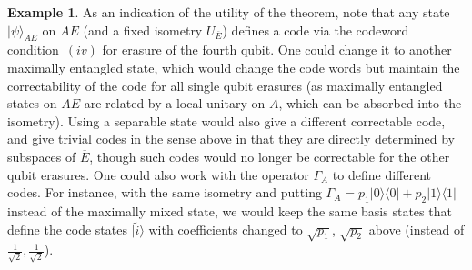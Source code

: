 \documentclass[11pt]{amsart}
\theoremstyle{definition}
\newtheorem{example}[thm]{Example}
\theoremstyle{definition}
\theoremstyle{definition}
\newcommand{\1}{\mathbb{I}}
\def\ket#1{| #1 \rangle}
\def\kb#1#2{|#1\rangle\!\langle #2 |}
\begin{document}
\begin{example}
As an indication of the utility of the theorem, note that any state $\ket{\psi}_{AE}$ on $AE$ (and a fixed isometry $U_{\overline{E}}$) defines a code via the codeword condition~$(iv)$ for erasure of the fourth qubit. One could change it to another maximally entangled state, which would change the code words but maintain the correctability of the code for all single qubit erasures (as maximally entangled states on $AE$ are related by a local unitary on $A$, which can be absorbed into the isometry).  Using a separable state would also give a different correctable code, and give trivial codes in the sense above in that they are directly determined by subspaces of $\overline{E}$, though such codes would no longer be correctable for the other qubit erasures. One could also work with the operator $\Gamma_A$ to define different codes. For instance, with the same isometry and putting $\Gamma_A = p_1 \kb{0}{0} + p_2 \kb{1}{1}$ instead of the maximally mixed state, we would keep the same basis states that define the code states $\ket{\widetilde{i}}$ with coefficients changed to $\sqrt{p_1}$, $\sqrt{p_2}$ above (instead of $\frac{1}{\sqrt{2}}, \frac{1}{\sqrt{2}}$). 


\end{example}
\end{document}

